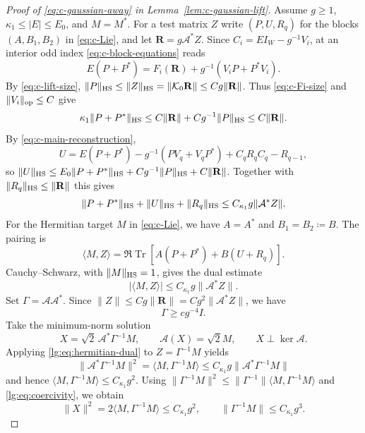 \documentclass[11pt]{article}
\numberwithin{equation}{section}
\theoremstyle{remark}
\newcommand{\Tr}{\operatorname{Tr}}
\begin{document}
\begin{proof}[Proof of \eqref{eq:c-gaussian-away} in Lemma~\ref{lem:c-gaussian-lift}]
Assume $g\ge1$, $\kappa_1\le|E|\le E_0$, and $M=M^*$.
For a test matrix $Z$ write $(P,U,R_q)$ for the blocks $(A,B_1,B_2)$
in \eqref{eq:c-Lie}, and let $\mathbf R=g\mathcal A^*Z$.
Since $C_i=EI_W-g^{-1}V_i$, at an interior odd index
\eqref{eq:c-block-equations} reads
\[
 E(P+P^*)=F_i(\mathbf R)+g^{-1}(V_iP+P^*V_i).
\]
By \eqref{eq:c-lift-size},
$\|P\|_{\rm HS}\le\|Z\|_{\rm HS}=\|\mathcal K_0\mathbf R\|
\le Cg\|\mathbf R\|$. Thus \eqref{eq:c-Fi-size} and
$\|V_i\|_{\rm op}\le C$ give
\[
 \kappa_1\|P+P^*\|_{\rm HS}
 \le C\|\mathbf R\|+Cg^{-1}\|P\|_{\rm HS}
 \le C\|\mathbf R\|.
\]
By \eqref{eq:c-main-reconstruction},
\[
 U=E(P+P^*)-g^{-1}(PV_q+V_qP^*)+C_qR_qC_q-R_{q-1},
\]
so $\|U\|_{\rm HS}\le E_0\|P+P^*\|_{\rm HS}
+Cg^{-1}\|P\|_{\rm HS}+C\|\mathbf R\|$. Together with
$\|R_q\|_{\rm HS}\le\|\mathbf R\|$ this gives
\begin{equation}\label{lg:eq:hermitian-blocks}
 \|P+P^*\|_{\rm HS}+\|U\|_{\rm HS}+\|R_q\|_{\rm HS}
 \le C_{\kappa_1}g\|\mathcal A^*Z\|.
\end{equation}
For the Hermitian target $M$ in \eqref{eq:c-Lie}, we have $A=A^*$
and $B_1=B_2\coloneqq B$. The pairing is
\[
 \langle M,Z\rangle=\Re\Tr[A(P+P^*)+B(U+R_q)].
\]
Cauchy--Schwarz, with $\|M\|_{\rm HS}=1$, gives the dual estimate
\begin{equation}\label{lg:eq:hermitian-dual}
 |\langle M,Z\rangle|\le C_{\kappa_1}g\|\mathcal A^*Z\|.
\end{equation}
Set $\Gamma=\mathcal A\mathcal A^*$. Since
$\|Z\|\le Cg\|\mathbf R\|=Cg^2\|\mathcal A^*Z\|$, we have
\begin{equation}\label{lg:eq:coercivity}
 \Gamma\ge cg^{-4}I .
\end{equation}
Take the minimum-norm solution
\begin{equation}\label{lg:eq:minimal-lift}
 X=\sqrt2\,\mathcal A^*\Gamma^{-1}M,\qquad
 \mathcal A(X)=\sqrt2 M,\qquad X\perp\ker\mathcal A .
\end{equation}
Applying \eqref{lg:eq:hermitian-dual} to $Z=\Gamma^{-1}M$ yields
\[
 \|\mathcal A^*\Gamma^{-1}M\|^2
 =\langle M,\Gamma^{-1}M\rangle
 \le C_{\kappa_1}g\|\mathcal A^*\Gamma^{-1}M\|
\]
and hence $\langle M,\Gamma^{-1}M\rangle\le C_{\kappa_1}g^2$.
Using $\|\Gamma^{-1}M\|^2\le\|\Gamma^{-1}\|\langle M,\Gamma^{-1}M\rangle$
and \eqref{lg:eq:coercivity}, we obtain
\begin{equation}\label{lg:eq:hermlift}
 \|X\|^2=2\langle M,\Gamma^{-1}M\rangle\le C_{\kappa_1}g^2,\qquad
 \|\Gamma^{-1}M\|\le C_{\kappa_1}g^3.
\end{equation}


\end{proof}
\end{document}
